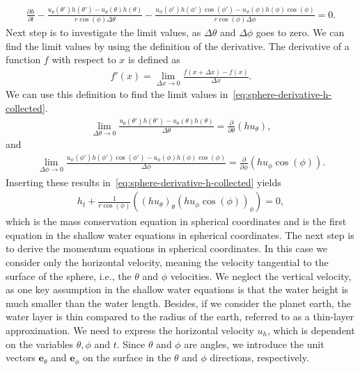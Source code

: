 \begin{align}\label{eq:sphere-derivative-h-collected}
    \frac{\partial h}{\partial t} - \frac{u_\theta(\theta') h(\theta') - u_\theta(\theta)h(\theta) }{r \cos(\phi) \Delta \theta} 
    - \frac{u_\phi(\phi ')h(\phi ') \cos(\phi') - u_\phi(\phi) h(\phi) \cos(\phi) }{r \cos (\phi) \Delta \phi} = 0.
\end{align}
Next step is to investigate the limit values, as $\Delta \theta$ and $\Delta \phi$ goes to zero.
We can find the limit values by using the definition of the derivative.
The derivative of a function $f$ with respect to $x$ is defined as
\begin{align*}
    f'(x) = \lim_{\Delta x \to 0} \frac{f(x + \Delta x) - f(x)}{\Delta x}.
\end{align*}
We can use this definition to find the limit values in~\eqref{eq:sphere-derivative-h-collected}.
\begin{align*}
    \lim_{\Delta \theta \to 0} \frac{ u_\theta(\theta ')h(\theta ') - u_\theta(\theta) h(\theta) }{\Delta \theta} = \frac{\partial}{\partial \theta} (h u_\theta ),
\end{align*}
and 
\begin{align*}
    \lim_{\Delta \phi \to 0} \frac{ u_\phi(\phi ')h(\phi ') \cos(\phi') - u_\phi(\phi) h(\phi) \cos(\phi) }{\Delta \phi} =  \frac{\partial}{\partial \phi} (h u_\phi \cos(\phi)).
\end{align*}
Inserting these results in~\eqref{eq:sphere-derivative-h-collected} yields
\begin{align*}
    h_t + \frac{1}{r \cos (\phi)} \left( {(h u_\theta)}_{\theta} {(h u_{\phi} \cos(\phi))}_{\phi}  \right) = 0,
\end{align*}
which is the mass conservation equation in spherical coordinates and is the first equation in the shallow water equations in spherical coordinates.
The next step is to derive the momentum equations in spherical coordinates.
In this case we consider only the horizontal velocity, meaning the velocity tangential to the surface of the sphere, i.e., the $\theta$ and $\phi$ velocities.
We neglect the vertical velocity, as one key assumption in the shallow water equations is that the water height is much smaller than the water length.
Besides, if we consider the planet earth, the water layer is thin compared to the radius of the earth, referred to as a thin-layer approximation.
We need to express the horizontal velocity $u_h$, which is dependent on the variables $\theta, \phi$ and $t$.
Since $\theta$ and $\phi$ are angles, we introduce the unit vectors $\mathbf{e}_\theta$ and $\mathbf{e}_\phi$ on the surface in the $\theta$ and $\phi$ directions, respectively.
